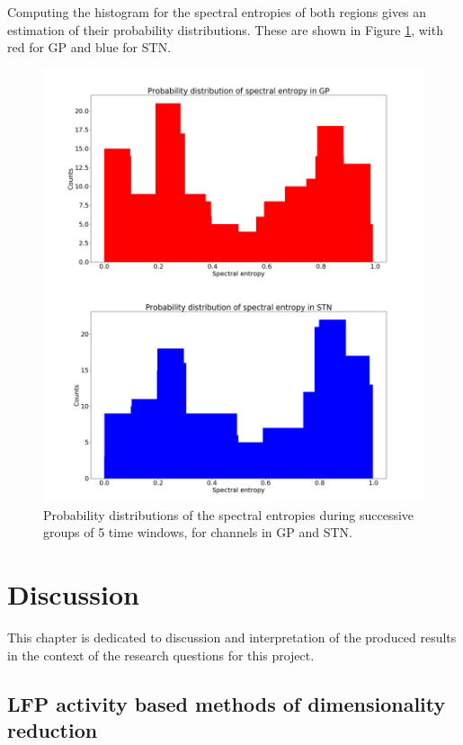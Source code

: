 \documentclass{kththesis}
\begin{document}
Computing the histogram for the spectral entropies of both regions gives an estimation of their probability distributions. These are shown in Figure \ref{fig:SE2}, with red for GP and blue for STN.

\begin{figure}[H]
    \centering
    \centerline{\includegraphics[width=1\textwidth]{images/spiking/hist_se.png}}
    \caption{Probability distributions of the spectral entropies during successive groups of 5 time windows, for channels in GP and STN.}
    \label{fig:SE2}
\end{figure}

\newpage
\chapter{Discussion}

This chapter is dedicated to discussion and interpretation of the produced results in the context of the research questions for this project.

\section{LFP activity based methods of dimensionality reduction}
\end{document}
